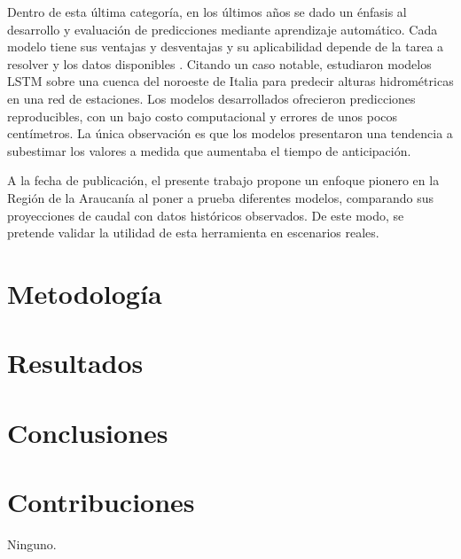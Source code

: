 \documentclass[hess, manuscript]{copernicus}
\begin{document}
Dentro de esta última categoría, en los últimos años se dado un énfasis al desarrollo y evaluación de predicciones mediante aprendizaje automático. Cada modelo tiene sus ventajas y desventajas y su aplicabilidad depende de la tarea a resolver y los datos disponibles \citep{fischer_impact_2025}. Citando un caso notable, \citet{luppichini_machine_2024} estudiaron modelos LSTM sobre una cuenca del noroeste de Italia para predecir alturas hidrométricas en una red de estaciones. Los modelos desarrollados ofrecieron predicciones reproducibles, con un bajo costo computacional y errores de unos pocos centímetros. La única observación es que los modelos presentaron una tendencia a subestimar los valores a medida que aumentaba el tiempo de anticipación.

A la fecha de publicación, el presente trabajo propone un enfoque pionero en la Región de la Araucanía al poner a prueba diferentes modelos, comparando sus proyecciones de caudal con datos históricos observados. De este modo, se pretende validar la utilidad de esta herramienta en escenarios reales.

\section{Metodología}
\label{sec:Metodologia}

\section{Resultados}
\label{sec:Resultados}

\clearpage
\section{Conclusiones}
\label{sec:Conclusiones}

\section{Contribuciones}
\label{Contribuciones}
Ninguno.
\end{document}
